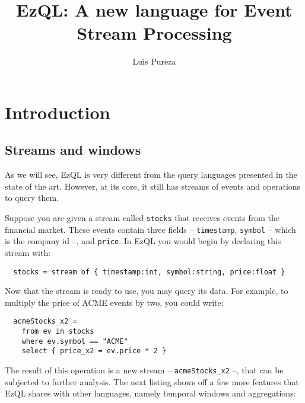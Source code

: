 \documentclass[a4,11pt]{report}
\begin{document}
\title{EzQL: A new language for Event Stream Processing}
\author{Lu\'{\i}s Pureza}

\maketitle

\tableofcontents

\addtolength{\parskip}{\baselineskip}
\chapter{Introduction}
\label{chap:introduction}

\lstset{
  language=EzQL,
  columns=fullflexible,
  basicstyle=\tt,
  keywordstyle=[1]\bf,
  keywordstyle=[2]\it,
}

\section{Streams and windows}


As we will see, EzQL is very different from the query languages
presented in the state of the art. However, at its core, it still has
streams of events and operations to query them.

Suppose you are given a stream called \verb=stocks= that receives
events from the financial market. These events contain three fields --
\verb=timestamp=, \verb=symbol= -- which is the company id --, and
\verb=price=. In EzQL you would begin by declaring this stream with:

\begin{lstlisting}
  stocks = stream of { timestamp:int, symbol:string, price:float }
\end{lstlisting}

Now that the stream is ready to use, you may query its data. For
example, to multiply the price of ACME events by two, you could write:

\begin{lstlisting}
  acmeStocks_x2 =
    from ev in stocks
    where ev.symbol == "ACME"
    select { price_x2 = ev.price * 2 }
\end{lstlisting}

The result of this operation is a new stream -- \verb=acmeStocks_x2=
--, that can be subjected to further analysis. The next listing shows
off a few more features that EzQL shares with other languages, namely
temporal windows and aggregations:
\end{document}
